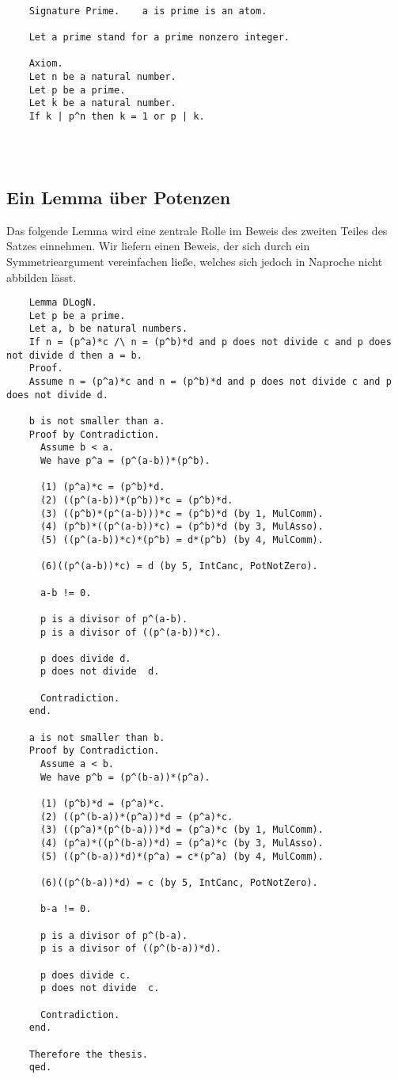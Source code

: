 \documentclass[a4paper,12pt]{scrartcl}
\begin{document}
\begin{lstlisting}

	Signature Prime.    a is prime is an atom.
	
	Let a prime stand for a prime nonzero integer.
	
	Axiom.
	Let n be a natural number.
	Let p be a prime.
	Let k be a natural number.
	If k | p^n then k = 1 or p | k.
	

	

\end{lstlisting}

\subsection{Ein Lemma über Potenzen}

Das folgende Lemma wird eine zentrale Rolle im Beweis des zweiten Teiles des Satzes einnehmen.
Wir liefern einen Beweis, der sich durch ein Symmetrieargument vereinfachen ließe, welches sich jedoch in Naproche nicht abbilden lässt.

\begin{lstlisting}
	Lemma DLogN.
	Let p be a prime.
	Let a, b be natural numbers.
	If n = (p^a)*c /\ n = (p^b)*d and p does not divide c and p does not divide d then a = b.
	Proof.
	Assume n = (p^a)*c and n = (p^b)*d and p does not divide c and p does not divide d.
	
	b is not smaller than a.
	Proof by Contradiction.
	  Assume b < a.
	  We have p^a = (p^(a-b))*(p^b).
	
	  (1) (p^a)*c = (p^b)*d.
	  (2) ((p^(a-b))*(p^b))*c = (p^b)*d.
	  (3) ((p^b)*(p^(a-b)))*c = (p^b)*d (by 1, MulComm).
	  (4) (p^b)*((p^(a-b))*c) = (p^b)*d (by 3, MulAsso).
	  (5) ((p^(a-b))*c)*(p^b) = d*(p^b) (by 4, MulComm).
	  
	  (6)((p^(a-b))*c) = d (by 5, IntCanc, PotNotZero).
	  
	  a-b != 0.
	
	  p is a divisor of p^(a-b).
	  p is a divisor of ((p^(a-b))*c).
	
	  p does divide d.
	  p does not divide  d.
	
	  Contradiction.
	end.
	
	a is not smaller than b.
	Proof by Contradiction.
	  Assume a < b.
	  We have p^b = (p^(b-a))*(p^a).
	
	  (1) (p^b)*d = (p^a)*c.
	  (2) ((p^(b-a))*(p^a))*d = (p^a)*c.
	  (3) ((p^a)*(p^(b-a)))*d = (p^a)*c (by 1, MulComm).
	  (4) (p^a)*((p^(b-a))*d) = (p^a)*c (by 3, MulAsso).
	  (5) ((p^(b-a))*d)*(p^a) = c*(p^a) (by 4, MulComm).
	  
	  (6)((p^(b-a))*d) = c (by 5, IntCanc, PotNotZero).
	  
	  b-a != 0.
	
	  p is a divisor of p^(b-a).
	  p is a divisor of ((p^(b-a))*d).
	
	  p does divide c.
	  p does not divide  c.
	
	  Contradiction.
	end.
	
	Therefore the thesis.
	qed.
\end{lstlisting}
\end{document}
